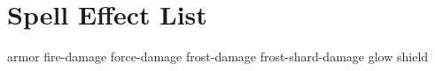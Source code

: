 \section{Spell Effect List}

{armor}
{fire-damage}
{force-damage}
{frost-damage}
{frost-shard-damage}
{glow}
{shield}

